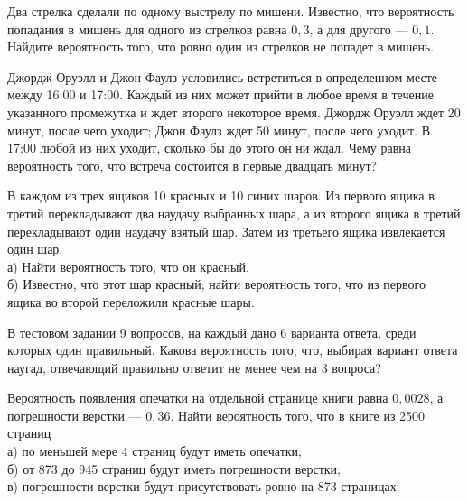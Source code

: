 \newpage\setcounter{zad}{0}



\begin{zkrW}{20}\noindent 
	Два стрелка сделали по одному выстрелу по мишени. Известно, что вероятность попадания в мишень для одного из стрелков равна $0{,}3$, а для другого --- $0{,}1$. Найдите вероятность того, что ровно один из стрелков не попадет в мишень.
 
\end{zkrW}

\begin{zkrW}{20}\noindent 
	Джордж Оруэлл и Джон Фаулз условились встретиться в определенном месте между 16:00 и 17:00. Каждый из них может прийти в любое время в течение указанного промежутка и ждет второго некоторое время. Джордж Оруэлл ждет 20 минут, после чего уходит; Джон Фаулз ждет 50 минут, после чего уходит. В 17:00 любой из них уходит, сколько бы до этого он ни ждал. Чему равна вероятность того, что встреча состоится в первые двадцать минут?
 
\end{zkrW}

\begin{zkrW}{20}\noindent 
	В каждом из трех ящиков 10 красных и 10 синих шаров. Из первого ящика в третий перекладывают два наудачу выбранных шара, а из второго ящика в третий перекладывают один наудачу взятый шар. Затем из третьего ящика извлекается один шар. \\ \indent а) Найти вероятность того, что он красный. \\ \indent б) Известно, что этот шар красный; найти вероятность того, что из первого ящика во второй переложили красные шары.
 
\end{zkrW}

\begin{zkrW}{20}\noindent 
	В тестовом задании 9 вопросов, на каждый дано 6 варианта ответа, среди которых один правильный. Какова вероятность того, что, выбирая вариант ответа наугад, отвечающий правильно ответит не менее чем на 3 вопроса?
 
\end{zkrW}

\begin{zkrW}{20}\noindent 
	Вероятность появления опечатки на отдельной странице книги равна $0{,}0028$, а погрешности верстки --- $0{,}36$. Найти вероятность того, что в книге из 2500 страниц \\ \indent а) по меньшей мере 4 страниц будут иметь опечатки; \\ \indent б) от 873 до 945 страниц будут иметь погрешности верстки; \\ \indent в) погрешности верстки будут присутствовать ровно на 873 страницах.
 
\end{zkrW}

